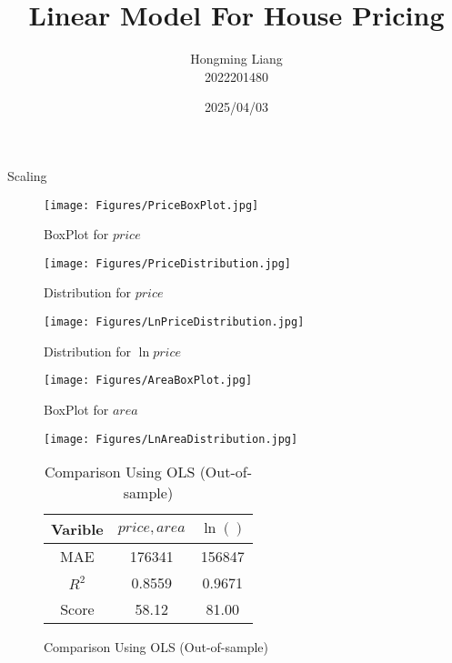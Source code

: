 \documentclass{beamer}
\author{Hongming Liang\\  2022201480}
\title{Linear Model For House Pricing}
\date{2025/04/03}
\begin{document}
\frame{\titlepage}

\begin{frame}{Scaling}
    \begin{figure}
        \begin{minipage}[t]{0.3\textwidth}
            \center
            \texttt{[image: Figures/PriceBoxPlot.jpg]}
            \caption{\scriptsize BoxPlot for $price$}
        \end{minipage}
        \begin{minipage}[t]{0.3\textwidth}
            \center
            \texttt{[image: Figures/PriceDistribution.jpg]}
            \caption{\scriptsize Distribution for $price$}
        \end{minipage}
        \begin{minipage}[t]{0.3\textwidth}
            \center
            \texttt{[image: Figures/LnPriceDistribution.jpg]}
            \caption{\scriptsize Distribution for $\ln price$}
        \end{minipage}
    \end{figure}
    \begin{figure}
        \begin{minipage}[t]{0.3\textwidth}
            \center
            \texttt{[image: Figures/AreaBoxPlot.jpg]}
            \caption{\scriptsize BoxPlot for $area$}
        \end{minipage}
        \begin{minipage}[t]{0.3\textwidth}
            \center
            \texttt{[image: Figures/LnAreaDistribution.jpg]}
            \caption{\scriptsize Distribution for $\ln area$}
        \end{minipage}
        \begin{minipage}[p]{0.25\textwidth}
            \scriptsize
            \begin{table}
                \center
                \begin{tabular}{c|cc}
                    \toprule
                    Varible & $price, area$ & $\ln()$ \\
                    \midrule
                    MAE & 176341 & 156847 \\
                    $R^2$ & 0.8559 & 0.9671 \\
                    Score & 58.12 & 81.00 \\
                    \bottomrule
                \end{tabular}
                \caption{\scriptsize Comparison Using OLS (Out-of-sample)}
            \end{table}
        \end{minipage}
    \end{figure}
\end{frame}
\end{document}

